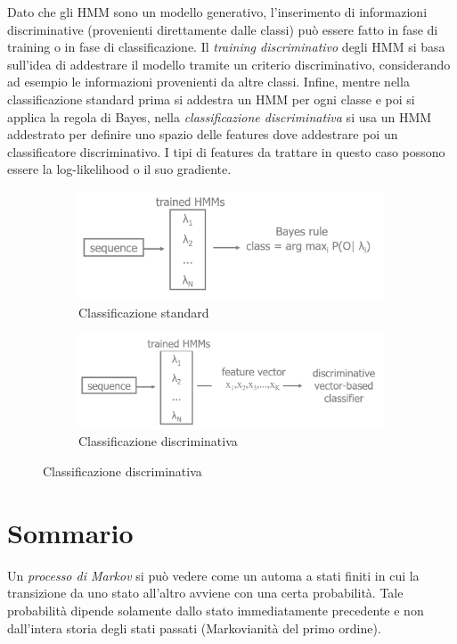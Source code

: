 \documentclass[a4paper,oneside,titlepage]{book}
\begin{document}
\noindent
Dato che gli HMM sono un modello generativo, l'inserimento di informazioni discriminative (provenienti direttamente dalle classi) può essere fatto in fase di training o in fase di classificazione. Il \textit{training discriminativo} degli HMM si basa sull'idea di addestrare il modello tramite un criterio discriminativo, considerando ad esempio le informazioni provenienti da altre classi. Infine, mentre nella classificazione standard prima si addestra un HMM per ogni classe e poi si applica la regola di Bayes, nella \textit{classificazione discriminativa} si usa un HMM addestrato per definire uno spazio delle features dove addestrare poi un classificatore discriminativo. I tipi di features da trattare in questo caso possono essere la log-likelihood o il suo gradiente.
\begin{figure}[htp]
	\begin{subfigure}{0.49\textwidth}
	    \centering
		\includegraphics[width=\textwidth, height=\textheight, keepaspectratio]{std-class.png}
		\caption{Classificazione standard}
	\end{subfigure}
	\hfill
	\begin{subfigure}{0.49\textwidth}
	    \centering
		\includegraphics[width=\textwidth, height=\textheight, keepaspectratio]{discr-class.png}
		\caption{Classificazione discriminativa}
	\end{subfigure}
\end{figure}

\section{Sommario}
Un \textit{processo di Markov} si può vedere come un automa a stati finiti in cui la transizione da uno stato all'altro avviene con una certa probabilità. Tale probabilità dipende solamente dallo stato immediatamente precedente e non dall'intera storia degli stati passati (Markovianità del primo ordine).
\end{document}

